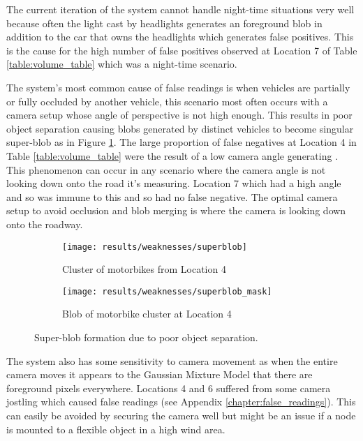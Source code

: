The current iteration of the system cannot handle night-time situations very well because often the light cast by headlights generates an foreground blob in addition to the car that owns the headlights which generates false positives. This is the cause for the high number of false positives observed at Location 7 of Table \ref{table:volume_table} which was a night-time scenario. 

The system's most common cause of false readings is when vehicles are partially or fully occluded by another vehicle, this scenario most often occurs with a camera setup whose angle of perspective is not high enough. This results in poor object separation causing blobs generated by distinct vehicles to become singular super-blob as in Figure \ref{fig:superblob}. The large proportion of false negatives at Location 4 in Table \ref{table:volume_table} were the result of a low camera angle generating . This phenomenon can occur in any scenario where the camera angle is not looking down onto the road it's measuring. Location 7 which had a high angle and so was immune to this and so had no false negative. The optimal camera setup to avoid occlusion and blob merging is where the camera is looking down onto the roadway.

\begin{figure}[H]
    \centering
     \begin{subfigure}[b]{0.45\textwidth}
        \texttt{[image: results/weaknesses/superblob]}
	\captionsetup{format = hang}
    \caption{Cluster of motorbikes from Location 4}
    \end{subfigure} 
    \begin{subfigure}[b]{0.45\textwidth}
        \texttt{[image: results/weaknesses/superblob\_mask]}	
	\captionsetup{format = hang}
    \caption{Blob of motorbike cluster at Location 4}
    \end{subfigure}
    \captionsetup{format = hang}
    \caption{Super-blob formation due to poor object separation.}
    \label{fig:superblob}
\end{figure}

The system also has some sensitivity to camera movement as when the entire camera moves it appears to the Gaussian Mixture Model that there are foreground pixels everywhere. Locations 4 and 6 suffered from some camera jostling which caused false readings (see Appendix \ref{chapter:false_readings}). This can easily be avoided by securing the camera well but might be an issue if a node is mounted to a flexible object in a high wind area.

